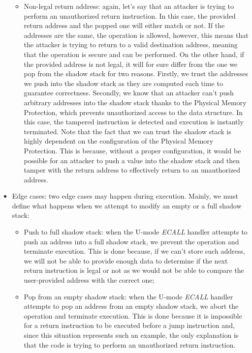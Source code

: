 \begin{itemize}
\begin{itemize}
      \item Non-legal return address: again, let's say that an attacker is trying
        to perform an unauthorized return instruction. In this case, the provided
        return address and the popped one will either match or not. If the
        addresses are the same, the operation is allowed, however, this means that
        the attacker is trying to return to a valid destination address, meaning
        that the operation is secure and can be performed. On the other hand, if
        the provided address is not legal, it will for sure differ from the one we
        pop from the shadow stack for two reasons. Firstly, we trust the addresses
        we push into the shadow stack as they are computed each time to guarantee
        correctness. Secondly, we know that an attacker can't push arbitrary addresses
        into the shadow stack thanks to the Physical Memory Protection, which
        prevents unauthorized access to the data structure. In this case, the
        tampered instruction is detected and execution is instantly terminated. Note
        that the fact that we can trust the shadow stack is highly dependent on the
        configuration of the Physical Memory Protection. This is because, without
        a proper configuration, it would be possible for an attacker to push a
        value into the shadow stack and then tamper with the return address to
        effectively return to an unauthorized address.
    \end{itemize}

  \item Edge cases: two edge cases may happen during execution. Mainly, we must
    define what happens when we attempt to modify an empty or a full shadow
    stack:
    \begin{itemize}
      \item Push to full shadow stack: when the U-mode \textit{ECALL} handler attempts
        to push an address into a full shadow stack, we prevent the operation
        and terminate execution. This is done because, if we can't store such
        address, we will not be able to provide enough data to determine if the next
        return instruction is legal or not as we would not be able to compare the
        user-provided address with the correct one;

      \item Pop from an empty shadow stack: when the U-mode \textit{ECALL} handler
        attempts to pop an address from an empty shadow stack, we abort the
        operation and terminate execution. This is done because it is impossible
        for a return instruction to be executed before a jump instruction and,
        since this situation represents such an example, the only explanation is
        that the code is trying to perform an unauthorized return instruction.
    \end{itemize}
\end{itemize}

